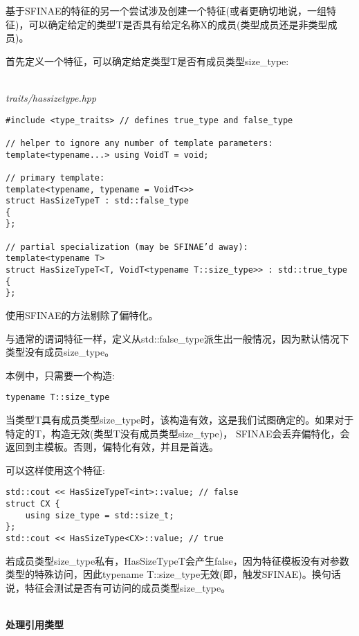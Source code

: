 
基于SFINAE的特征的另一个尝试涉及创建一个特征(或者更确切地说，一组特征)，可以确定给定的类型T是否具有给定名称X的成员(类型成员还是非类型成员)。


首先定义一个特征，可以确定给定类型T是否有成员类型size\_type:

\hspace*{\fill} \\ %
\noindent
\textit{traits/hassizetype.hpp}
\begin{lstlisting}[style=styleCXX]
#include <type_traits> // defines true_type and false_type

// helper to ignore any number of template parameters:
template<typename...> using VoidT = void;

// primary template:
template<typename, typename = VoidT<>>
struct HasSizeTypeT : std::false_type
{
};

// partial specialization (may be SFINAE’d away):
template<typename T>
struct HasSizeTypeT<T, VoidT<typename T::size_type>> : std::true_type
{
};
\end{lstlisting}

使用SFINAE的方法剔除了偏特化。

与通常的谓词特征一样，定义从std::false\_type派生出一般情况，因为默认情况下类型没有成员size\_type。

本例中，只需要一个构造:

\begin{lstlisting}[style=styleCXX]
typename T::size_type
\end{lstlisting}

当类型T具有成员类型size\_type时，该构造有效，这是我们试图确定的。如果对于特定的T，构造无效(类型T没有成员类型size\_type)， SFINAE会丢弃偏特化，会返回到主模板。否则，偏特化有效，并且是首选。

可以这样使用这个特征:

\begin{lstlisting}[style=styleCXX]
std::cout << HasSizeTypeT<int>::value; // false
struct CX {
	using size_type = std::size_t;
};
std::cout << HasSizeType<CX>::value; // true
\end{lstlisting}

若成员类型size\_type私有，HasSizeTypeT会产生false，因为特征模板没有对参数类型的特殊访问，因此typename T::size\_type无效(即，触发SFINAE)。换句话说，特征会测试是否有可访问的成员类型size\_type。

\hspace*{\fill} \\ %
\noindent
\textbf{处理引用类型}

